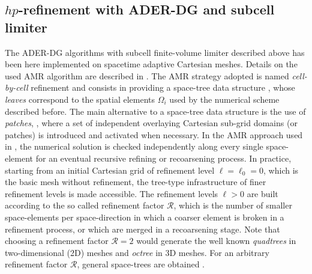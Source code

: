 \begin{marginfigure}[-2cm]
	\caption[
  	  Finite state machines of Peano,  
	]{Cartoon of the / architecture.
	  Figure modified from~\cite{Weinzierl2015}.}
	\label{fig:peano-finite-automata}
\end{marginfigure}

\subsection[ADER-DG $hp$-refinement]{$hp$-refinement with ADER-DG and subcell 
limiter}
The ADER-DG algorithms with subcell finite-volume limiter described above
has been here implemented on spacetime adaptive Cartesian meshes. Details
on the used AMR algorithm are described in
\cite{AMR3DCL,Zanotti2015c,Zanotti2015c,Zanotti2015d,ADERDGVisc}.
The AMR strategy adopted is named
\emph{cell-by-cell} refinement and consists in providing a space-tree data
structure \cite{Khokhlov98, Peano1, Peano2, AMR3DCL},
whose \emph{leaves} correspond to the spatial elements $\Omega_i$ used by
the numerical scheme described before. The main alternative to a
space-tree data structure is the use of  \emph{patches},
\cite{Berger-Oliger1984, berger85, Berger-Colella1989}, where a
set of independent overlaying Cartesian sub-grid domains (or patches)
is introduced and activated when necessary. In the AMR approach used in
, the numerical solution is checked independently along every single
space-element for an eventual recursive refining or recoarsening
process.
%
In practice, starting from an initial Cartesian grid of refinement level
$\ell=\ell_0=0$, which is the basic mesh without refinement, the
tree-type infrastructure of finer {refinement levels} is made
accessible. The refinement levels $\ell>0$ are built according to the so
called {refinement factor} $\mathcal{R}$, which is the number of smaller
space-elements per space-direction in which a coarser element is broken
in a refinement process, or which are merged in a recoarsening
stage. Note that choosing a refinement factor $\mathcal{R}=2$ would
generate the well known \emph{quadtrees} in two-dimensional (2D) meshes and
\emph{octree} in 3D meshes. For an arbitrary refinement factor
$\mathcal{R}$, general space-trees are obtained \cite{Peano1,Peano2}.

